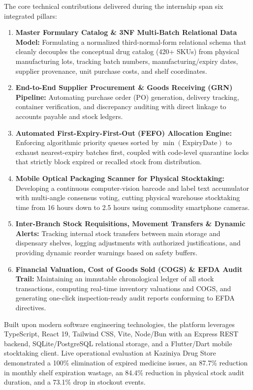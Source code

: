 The core technical contributions delivered during the internship span six integrated pillars:
\begin{enumerate}
    \item \textbf{Master Formulary Catalog \& 3NF Multi-Batch Relational Data Model:} Formulating a normalized third-normal-form relational schema that cleanly decouples the conceptual drug catalog (420+ SKUs) from physical manufacturing lots, tracking batch numbers, manufacturing/expiry dates, supplier provenance, unit purchase costs, and shelf coordinates.
    \item \textbf{End-to-End Supplier Procurement \& Goods Receiving (GRN) Pipeline:} Automating purchase order (PO) generation, delivery tracking, container verification, and discrepancy auditing with direct linkage to accounts payable and stock ledgers.
    \item \textbf{Automated First-Expiry-First-Out (FEFO) Allocation Engine:} Enforcing algorithmic priority queues sorted by $\min(\text{ExpiryDate})$ to exhaust nearest-expiry batches first, coupled with code-level quarantine locks that strictly block expired or recalled stock from distribution.
    \item \textbf{Mobile Optical Packaging Scanner for Physical Stocktaking:} Developing a continuous computer-vision barcode and label text accumulator with multi-angle consensus voting, cutting physical warehouse stocktaking time from 16 hours down to 2.5 hours using commodity smartphone cameras.
    \item \textbf{Inter-Branch Stock Requisitions, Movement Transfers \& Dynamic Alerts:} Tracking internal stock transfers between main storage and dispensary shelves, logging adjustments with authorized justifications, and providing dynamic reorder warnings based on safety buffers.
    \item \textbf{Financial Valuation, Cost of Goods Sold (COGS) \& EFDA Audit Trail:} Maintaining an immutable chronological ledger of all stock transactions, computing real-time inventory valuations and COGS, and generating one-click inspection-ready audit reports conforming to EFDA directives.
\end{enumerate}

Built upon modern software engineering technologies, the platform leverages TypeScript, React 19, Tailwind CSS, Vite, Node/Bun with an Express REST backend, SQLite/PostgreSQL relational storage, and a Flutter/Dart mobile stocktaking client. Live operational evaluation at Kaziniya Drug Store demonstrated a 100\% elimination of expired medicine issues, an 87.7\% reduction in monthly shelf expiration wastage, an 84.4\% reduction in physical stock audit duration, and a 73.1\% drop in stockout events.


